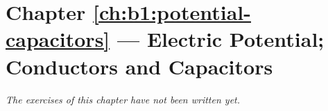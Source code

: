 \section*{Chapter \ref{ch:b1:potential-capacitors} --- Electric Potential; Conductors and Capacitors}


\emph{The exercises of this chapter have not been written yet.}
